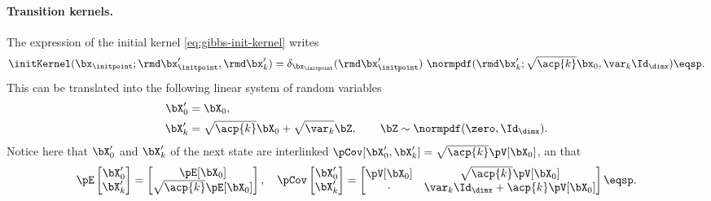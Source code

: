 \paragraph{Transition kernels.}
The expression of the initial kernel \eqref{eq:gibbs-init-kernel} writes
\begin{equation*}
    \initKernel(\bx_\initpoint; \rmd \bx_\initpoint', \rmd \bx_k')
        = \delta_{\bx_\initpoint}(\rmd \bx_\initpoint')
            \ \normpdf(\rmd \bx_k'; \sqrt{\acp{k}} \bx_0, \var_{k} \Id_\dimx)
    \eqsp.
\end{equation*}
This can be translated into the following linear system of random variables
\begin{align*}
    \bX_0' 
        & = \bX_0,
        \\
    \bX_k' 
        & = \sqrt{\acp{k}} \bX_0 + \sqrt{\var_k} \bZ, 
        \qquad \bZ \sim \normpdf(\zero, \Id_\dimx).
\end{align*}
Notice here that $\bX_0'$ and $\bX_k'$ of the next state are interlinked
$\pCov[\bX_0', \bX_k'] = \sqrt{\acp{k}} \pV[\bX_0]$, an that
\begin{equation}
    \label{eq:gibbs-init-kernel-gauss-update}
    \pE\begin{bmatrix}\bX_0'\\\bX_k'\end{bmatrix} = \begin{bmatrix}\pE[\bX_0]\\\sqrt{\acp{k}}\pE[\bX_0]\end{bmatrix},
    \quad
    \pCov\begin{bmatrix}\bX_0'\\\bX_k'\end{bmatrix} = \begin{bmatrix}\pV[\bX_0] & \sqrt{\acp{k}}\pV[\bX_0]\\\cdot & \var_{k} \Id_\dimx + \acp{k} \pV[\bX_0]\end{bmatrix}
    \eqsp.
\end{equation}

